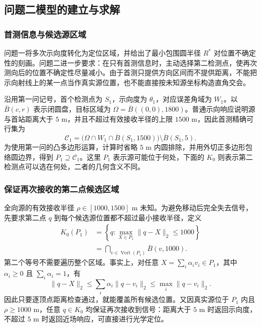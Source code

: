 \subsection{问题二模型的建立与求解}\label{sec:q2}

\subsubsection{首测信息与候选源区域}

问题一将多次示向度转化为定位区域，并给出了最小包围圆半径 $R^*$ 对位置不确定性的刻画。问题二进一步要求：在只有首测信息时，主动选择第二检测点，使再次测向后的位置不确定性尽量减小。由于首测只提供方向区间而不提供距离，不能把示向射线上的某一点当作真实源位置，也不能直接按未知源坐标构造直角交会。

沿用第一问记号，首个检测点为 $S_1$，示向度为 $\theta_1$，对应误差角域为 $W_1$。以 $\overline B(c,r)$ 表示闭圆盘，目标区域为 $\Omega=\overline B((0,0),1800)$。普通示向响应说明源与首站距离大于 $5$ m，并且不超过有效接收半径的上限 $1500$ m，因此首测精确可行集为
\begin{equation}\label{eq:q2-source}
\mathcal C_1=\bigl(\Omega\cap W_1\cap\overline B(S_1,1500)\bigr)\setminus\overline B(S_1,5).
\end{equation}
为使用第一问的凸多边形运算，计算时省略 $5$ m 内圆排除，并用外切正多边形包络圆边界，得到 $P_1\supseteq\mathcal C_1$。这里 $P_1$ 表示源可能位于何处，下面的 $K_0$ 则表示第二检测点可以选在何处，二者的几何含义不同。

\subsubsection{保证再次接收的第二点候选区域}

全向源的有效接收半径 $\rho\in[1000,1500]$ m 未知。为避免移动后完全失去信号，先要求第二点 $q$ 到每个候选源位置都不超过最小接收半径，定义
\begin{equation}\label{eq:q2-safe}
\begin{aligned}
K_0(P_1)&=\left\{q:\max_{X\in P_1}\|q-X\|_2\le1000\right\}\\
&=\bigcap_{v\in\operatorname{Vert}(P_1)}\overline B(v,1000).
\end{aligned}
\end{equation}
第二个等号不需要遍历整个区域。事实上，对任意 $X=\sum_i\alpha_i v_i\in P_1$，其中 $\alpha_i\ge0$ 且 $\sum_i\alpha_i=1$，有
\[
\|q-X\|_2\le\sum_i\alpha_i\|q-v_i\|_2\le\max_i\|q-v_i\|_2.
\]
因此只要逐顶点距离检查通过，就能覆盖所有候选位置。又因真实源位于 $P_1$ 内且 $\rho\ge1000$ m，任意 $q\in K_0$ 均保证再次接收到信号：距离大于 $5$ m 时返回示向度，不超过 $5$ m 时返回近场响应，可直接进行光学定位。

